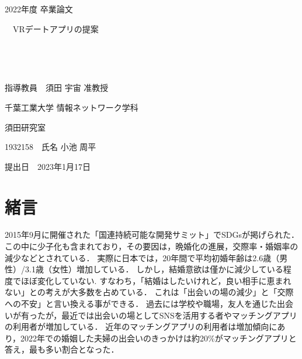 \documentclass[12pt,a4j,titlepage]{ltjsarticle}
\begin{document}
\begin{titlepage}
  \begin{center}
  
    \vspace*{20truept}
    
    {\LARGE 2022年度 卒業論文} 
    
    \vspace*{75truept}
    
    {\Huge 　VRデートアプリの提案}　%

    \vspace{10truept}

    {\Huge }　%

    \vspace{10truept}

    {\Huge }　%

    \vspace{85truept}
    
    {\LARGE 指導教員　須田 宇宙 准教授}
    
    \vspace{60truept}
    
    {\LARGE 千葉工業大学 情報ネットワーク学科}
    
    \vspace{15truept}
    
    {\LARGE 須田研究室}
    
    \vspace{70truept}
    
    {\LARGE 1932158　氏名 小池 周平 }　%

    \vspace{70truept}
    
  \end{center}
  \begin{flushright}

    {\LARGE 提出日　2023年1月17日}
  
  \end{flushright}
\end{titlepage}

\setcounter{tocdepth}{3}
\tableofcontents
\listoftables
\listoffigures
\clearpage

\section{緒言}\label{緒言}
2015年9月に開催された「国連持続可能な開発サミット」でSDGsが掲げられた．この中に少子化も含まれており，その要因は，晩婚化の進展\cite{sasaki2012}，交際率・婚姻率の減少\cite{naikakufu2019}などとされている．
実際に日本では，20年間で平均初婚年齢は2.6歳（男性）/3.1歳（女性）増加している．
しかし，結婚意欲は僅かに減少している程度でほぼ変化していない.
すなわち，「結婚はしたいけれど，良い相手に恵まれない」との考えが大多数を占めている\cite{naikakufu2019}．
これは「出会いの場の減少」と「交際への不安」と言い換える事ができる．
過去には学校や職場，友人を通じた出会いが有ったが，最近では出会いの場としてSNSを活用する者やマッチングアプリの利用者が増加している．
近年のマッチングアプリの利用者は増加傾向にあり，2022年での婚姻した夫婦の出会いのきっかけは約20\%がマッチングアプリと答え，最も多い割合となった．
\end{document}
